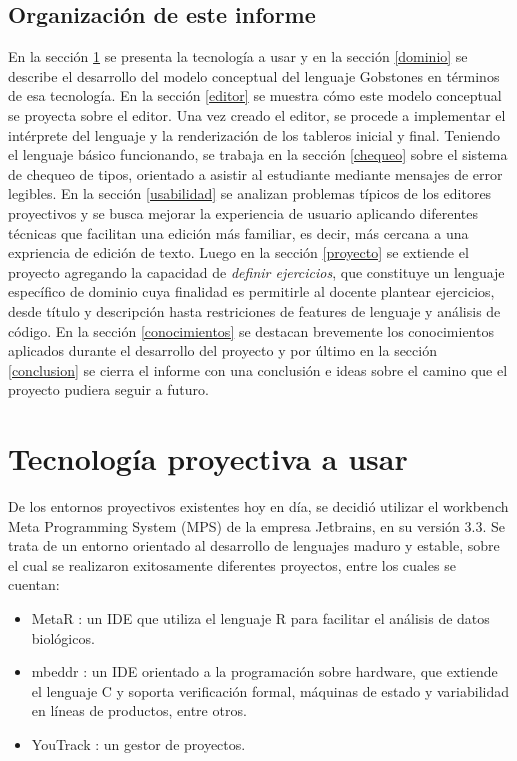 \subsection{Organización de este informe}

En la sección \ref{tecnologias} se presenta la tecnología a usar y en la sección \ref{dominio} se describe el desarrollo del modelo conceptual del lenguaje Gobstones en términos de esa tecnología. En la sección \ref{editor} se muestra cómo este modelo conceptual se proyecta sobre el editor. Una vez creado el editor, se procede a implementar el intérprete del lenguaje y la renderización de los tableros inicial y final. Teniendo el lenguaje básico funcionando, se trabaja en la sección \ref{chequeo} sobre el sistema de chequeo de tipos, orientado a asistir al estudiante mediante mensajes de error legibles. En la sección \ref{usabilidad} se analizan problemas típicos de los editores proyectivos y se busca mejorar la experiencia de usuario aplicando diferentes técnicas que facilitan una edición más familiar, es decir, más cercana a una expriencia de edición de texto. Luego en la sección \ref{proyecto} se extiende el proyecto agregando la capacidad de \textit{definir ejercicios}, que constituye un lenguaje específico de dominio cuya finalidad es permitirle al docente plantear ejercicios, desde título y descripción hasta restriciones de features de lenguaje y análisis de código. En la sección \ref{conocimientos} se destacan brevemente los conocimientos aplicados durante el desarrollo del proyecto y por último en la sección \ref{conclusion} se cierra el informe con una conclusión e ideas sobre el camino que el proyecto pudiera seguir a futuro.

\section{Tecnología proyectiva a usar}\label{tecnologias}

De los entornos proyectivos existentes hoy en día, se decidió utilizar el workbench Meta Programming System (MPS)  de la empresa Jetbrains, en su versión 3.3.
Se trata de un entorno orientado al desarrollo de lenguajes maduro y estable, sobre el cual se realizaron exitosamente diferentes proyectos, entre los cuales se cuentan:
\begin{itemize}
\item MetaR : un IDE que utiliza el lenguaje R para facilitar el análisis de datos biológicos.
\item mbeddr : un IDE orientado a la programación sobre hardware, que extiende el lenguaje C y soporta verificación formal, máquinas de estado y variabilidad en líneas de productos, entre otros.
\item YouTrack : un gestor de proyectos.
\end{itemize}

